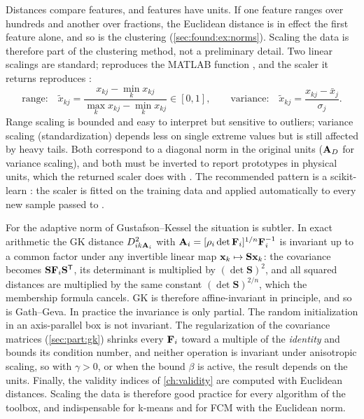Distances compare features, and features have units. If one feature ranges over hundreds and another over fractions, the Euclidean distance is in effect the first feature alone, and so is the clustering (\cref{sec:found:ex:norms}). Scaling the data is therefore part of the clustering method, not a preliminary detail. Two linear scalings are standard;  reproduces the MATLAB function , and the scaler it returns reproduces :
\begin{equation}
  \text{range:}\quad \tilde{x}_{kj}=\frac{x_{kj}-\min_k x_{kj}}{\max_k x_{kj}-\min_k x_{kj}}\in[0,1],\qquad
  \text{variance:}\quad \tilde{x}_{kj}=\frac{x_{kj}-\bar{x}_j}{\sigma_j}.
  \label{eq:found:scaling}
\end{equation}
Range scaling is bounded and easy to interpret but sensitive to outliers; variance scaling (standardization) depends less on single extreme values but is still affected by heavy tails. Both correspond to a diagonal norm in the original units ($\mathbf{A}_D$ for variance scaling), and both must be inverted to report prototypes in physical units, which the returned scaler does with . The recommended pattern is a scikit-learn : the scaler is fitted on the training data and applied automatically to every new sample passed to .

For the adaptive norm of Gustafson--Kessel the situation is subtler. In exact arithmetic the GK distance $D^2_{ik\mathbf{A}_i}$ with $\mathbf{A}_i=[\rho_i\det\mathbf{F}_i]^{1/n}\mathbf{F}_i^{-1}$ is invariant up to a common factor under any invertible linear map $\mathbf{x}_k\mapsto\mathbf{S}\mathbf{x}_k$: the covariance becomes $\mathbf{S}\mathbf{F}_i\mathbf{S}^{\mathsf{T}}$, its determinant is multiplied by $(\det\mathbf{S})^2$, and all squared distances are multiplied by the same constant $(\det\mathbf{S})^{2/n}$, which the membership formula cancels. GK is therefore affine-invariant in principle, and so is Gath--Geva. In practice the invariance is only partial. The random initialization in an axis-parallel box is not invariant. The regularization of the covariance matrices (\cref{sec:part:gk}) shrinks every $\mathbf{F}_i$ toward a multiple of the \emph{identity} and bounds its condition number, and neither operation is invariant under anisotropic scaling, so with $\gamma>0$, or when the bound $\beta$ is active, the result depends on the units. Finally, the validity indices of \cref{ch:validity} are computed with Euclidean distances. Scaling the data is therefore good practice for every algorithm of the toolbox, and indispensable for k-means and for FCM with the Euclidean norm.

